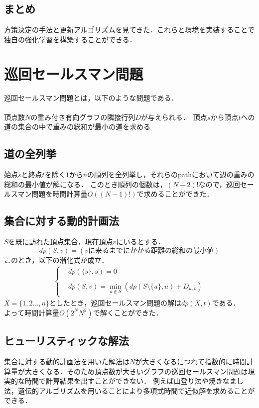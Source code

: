 \documentclass[a4paper,12pt]{jsreport}
\theoremstyle{definition}
\begin{document}
\section{まとめ}
方策決定の手法と更新アルゴリズムを見てきた．これらと環境を実装することで独自の強化学習を構築することができる．


\chapter{巡回セールスマン問題}
巡回セールスマン問題とは，以下のような問題である．\\ \\
頂点数$N$の重み付き有向グラフの隣接行列$D$が与えられる．\ 頂点$s$から頂点$t$への道の集合の中で重みの総和が最小の道を求める
\section{道の全列挙}
始点$s$と終点$t$を除く$1$から$n$の順列を全列挙し，それらのpathにおいて辺の重みの総和の最小値が解になる．
このとき順列の個数は，$(N-2)!$なので，巡回セールスマン問題を時間計算量$O((N-1)!)$で求めることができた．

\section{集合に対する動的計画法}
$S$を既に訪れた頂点集合，現在頂点$v$にいるとする．
$$dp(S,v)=(vに来るまでにかかる距離の総和の最小値)$$
このとき，以下の漸化式が成立．
\begin{eqnarray}
    \begin{cases}
        & dp(\{s\},s)=0\\ \\
        & \displaystyle dp(S,v)=\min_{u \notin S}(dp(S\setminus\{u\},u)+D_{u,v})
    \end{cases}
\end{eqnarray}
$X=\{1,2\ldots ,n\}$としたとき，巡回セールスマン問題の解は$dp(X,t)$である．\\
よって時間計算量$O(2^NN^2)$で解くことができた．
\section{ヒューリスティックな解法}
集合に対する動的計画法を用いた解法は$N$が大きくなるにつれて指数的に時間計算量が大きくなる．そのため頂点数が大きいグラフの巡回セールスマン問題は現実的な時間で計算結果を出すことができない．
例えば山登り法や焼きなまし法，遺伝的アルゴリズムを用いることにより多項式時間で近似解を求めることができる．
\end{document}
